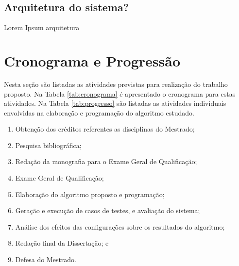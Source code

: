\documentclass[12pt]{article}
\begin{document}
\subsection{Arquitetura do sistema?}

Lorem Ipsum arquitetura

\newpage

\section{Cronograma e Progressão}

Nesta seção são listadas as atividades previstas para realização do trabalho proposto.
Na Tabela \ref{tab:cronograma} é apresentado o cronograma para estas atividades.
Na Tabela \ref{tab:progresso} são listadas as atividades individuais envolvidas na elaboração
e programação do algoritmo estudado.

\begin{enumerate}
	\item Obtenção dos créditos referentes as disciplinas do Mestrado;
	\item Pesquisa bibliográfica;
	\item Redação da monografia para o Exame Geral de Qualificação;
	\item Exame Geral de Qualificação;
	\item Elaboração do algoritmo proposto e programação;
	\item Geração e execução de casos de testes, e avaliação do sistema;
	\item Análise dos efeitos das configurações sobre os resultados do algoritmo;
	\item Redação final da Dissertação; e
	\item Defesa do Mestrado.
\end{enumerate}
\end{document}
